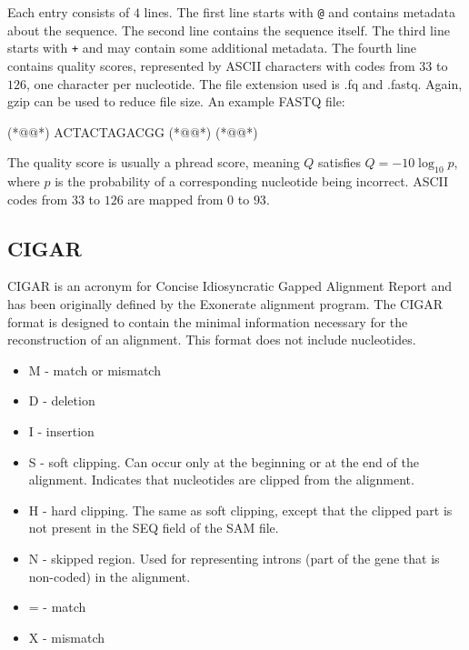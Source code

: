 \noindent Each entry consists of $4$ lines. The first line starts with \texttt{@} and contains metadata about the sequence. The second line contains the sequence itself. The third line starts with \texttt{+} and may contain some additional metadata. The fourth line contains quality scores, represented by ASCII characters with codes from $33$ to $126$, one character per nucleotide. The file extension used is .fq and .fastq. Again, gzip can be used to reduce file size. An example FASTQ file:

\begin{FastxFile}[fastq]
(*@@*)
ACTACTAGACGG
(*@@*)
(*@\FastxQualityLine{*!]^#[$*@*!(}@*)
\end{FastxFile}

\noindent The quality score is usually a phread score, meaning $Q$ satisfies $Q = -10 \log_{10} p$, where $p$ is the probability of a corresponding nucleotide being incorrect. ASCII codes from $33$ to $126$ are mapped from $0$ to $93$.

\subsection{CIGAR}

CIGAR is an acronym for Concise Idiosyncratic Gapped Alignment Report and has been originally defined by the Exonerate alignment program. The CIGAR format is designed to contain the minimal information necessary for the reconstruction of an alignment. This format does not include nucleotides.
\cite{cigar_nbis_explained}

\begin{itemize}
\setlength{\topsep}{.35\baselineskip}
\setlength{\itemsep}{.12\baselineskip}
\setlength{\parsep}{0pt}
\item M - match or mismatch
\item D - deletion
\item I - insertion
\item S - soft clipping. Can occur only at the beginning or at the end of the alignment. Indicates that nucleotides are clipped from the alignment.
\item H - hard clipping. The same as soft clipping, except that the clipped part is not present in the SEQ field of the SAM file.
\item N - skipped region. Used for representing introns (part of the gene that is non-coded) in the alignment.
\item = - match
\item X - mismatch
\end{itemize}
